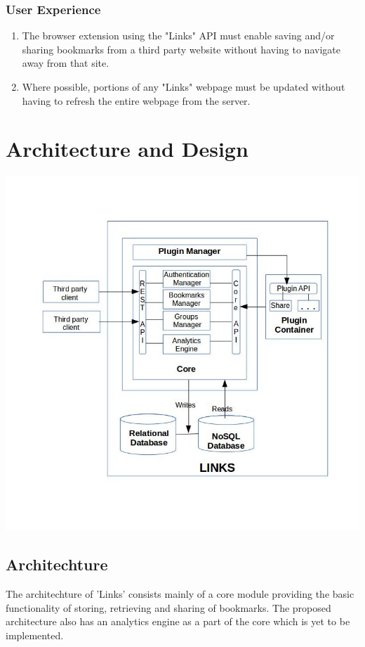 \documentclass[11pt]{report} %
\begin{document}
\subsection{User Experience}
\begin{enumerate}
\item
The browser extension using the "Links" API  must enable saving and/or sharing bookmarks from a third party website without having to navigate away from that site.
\item
Where possible, portions of any "Links" webpage must be updated without having to refresh the entire webpage from the server.
\end{enumerate}


\chapter{Architecture and Design}

\includegraphics[scale=0.5]{architecture_diagram.jpg}
\section{Architechture}
The architechture of 'Links' consists mainly of a core module providing the basic functionality of storing, retrieving and sharing of bookmarks. The proposed architecture also has an analytics engine as a part of the core which is yet to be implemented.
 \\
 
\end{document}
